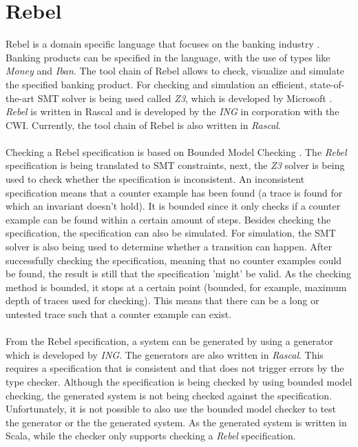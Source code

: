 \section{Rebel}
Rebel is a domain specific language that focuses on the banking industry \cite{stoel2016solving}. Banking products can be specified in the language, with the use of types like \textit{Money} and \textit{Iban}. The tool chain of Rebel allows to check, visualize and simulate the specified banking product. For checking and simulation an efficient, state-of-the-art SMT solver is being used called \textit{Z3}, which is developed by Microsoft \cite{de2008z3}. \textit{Rebel} is written in Rascal and is developed by the \textit{ING} in corporation with the CWI. Currently, the tool chain of Rebel is also written in \textit{Rascal}.\\
\\
Checking a Rebel specification is based on Bounded Model Checking \cite{stoel2016solving}. The \textit{Rebel} specification is being translated to SMT constraints, next, the \textit{Z3} solver is being used to check whether the specification is inconsistent. An inconsistent specification means that a counter example has been found (a trace is found for which an invariant doesn't hold). It is bounded since it only checks if a counter example can be found within a certain amount of steps. Besides checking the specification, the specification can also be simulated. For simulation, the SMT solver is also being used to determine whether a transition can happen. After successfully checking the specification, meaning that no counter examples could be found, the result is still that the specification 'might' be valid. As the checking method is bounded, it stops at a certain point (bounded, for example, maximum depth of traces used for checking). This means that there can be a long or untested trace such that a counter example can exist.\\
\\
From the Rebel specification, a system can be generated by using a generator which is developed by \textit{ING}. The generators are also written in \textit{Rascal}. This requires a specification that is consistent and that does not trigger errors by the type checker. Although the specification is being checked by using bounded model checking, the generated system is not being checked against the specification. Unfortunately, it is not possible to also use the bounded model checker to test the generator or the the generated system. As the generated system is written in Scala, while the checker only supports checking a \textit{Rebel} specification.


